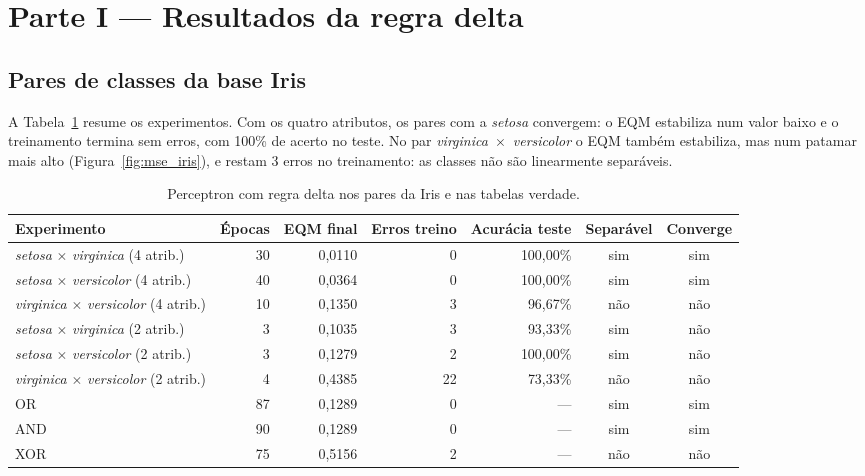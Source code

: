 \documentclass[12pt,a4paper]{article}
\newcommand{\setosa}{\emph{setosa}}
\newcommand{\versicolor}{\emph{versicolor}}
\newcommand{\virginica}{\emph{virginica}}
\begin{document}
\section{Parte I --- Resultados da regra delta}\label{sec:parte1}

\subsection{Pares de classes da base Iris}

A Tabela~\ref{tab:regra_delta} resume os experimentos. Com os quatro atributos, os pares com a \setosa{} convergem: o EQM estabiliza num valor baixo e o treinamento termina sem erros, com 100\% de acerto no teste. No par \virginica{}~$\times$~\versicolor{} o EQM também estabiliza, mas num patamar mais alto (Figura~\ref{fig:mse_iris}), e restam 3 erros no treinamento: as classes não são linearmente separáveis.

\begin{table}[H]
\centering
\caption{Perceptron com regra delta nos pares da Iris e nas tabelas verdade.}
\label{tab:regra_delta}
\small
\begin{tabular}{lrrrrcc}
\toprule
Experimento & Épocas & EQM final & Erros treino & Acurácia teste & Separável & Converge \\
\midrule
\setosa{} $\times$ \virginica{} (4 atrib.)         & 30 & 0,0110 & 0  & 100,00\% & sim & sim \\
\setosa{} $\times$ \versicolor{} (4 atrib.)        & 40 & 0,0364 & 0  & 100,00\% & sim & sim \\
\virginica{} $\times$ \versicolor{} (4 atrib.)     & 10 & 0,1350 & 3  & 96,67\%  & não & não \\
\setosa{} $\times$ \virginica{} (2 atrib.)         & 3  & 0,1035 & 3  & 93,33\%  & sim & não \\
\setosa{} $\times$ \versicolor{} (2 atrib.)        & 3  & 0,1279 & 2  & 100,00\% & sim & não \\
\virginica{} $\times$ \versicolor{} (2 atrib.)     & 4  & 0,4385 & 22 & 73,33\%  & não & não \\
\midrule
OR  & 87 & 0,1289 & 0 & --- & sim & sim \\
AND & 90 & 0,1289 & 0 & --- & sim & sim \\
XOR & 75 & 0,5156 & 2 & --- & não & não \\
\bottomrule
\end{tabular}
\end{table}
\end{document}
